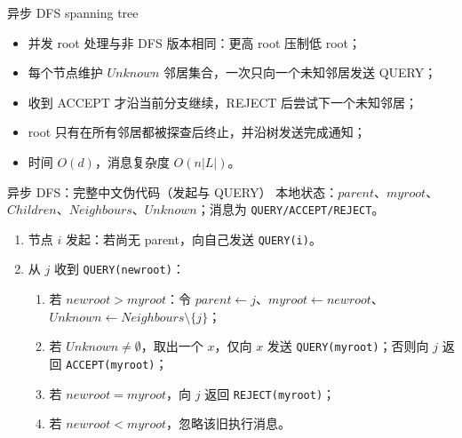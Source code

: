 \documentclass[UTF8,fontset=none,aspectratio=169,10pt]{beamer}
\begin{document}
\begin{frame}{异步 DFS spanning tree}
\begin{itemize}
  \item 并发 root 处理与非 DFS 版本相同：更高 root 压制低 root；
  \item 每个节点维护 $Unknown$ 邻居集合，一次只向一个未知邻居发送 QUERY；
  \item 收到 ACCEPT 才沿当前分支继续，REJECT 后尝试下一个未知邻居；
  \item root 只有在所有邻居都被探查后终止，并沿树发送完成通知；
  \item 时间 $O(d)$，消息复杂度 $O(n|L|)$。
\end{itemize}
\end{frame}

\begin{frame}{异步 DFS：完整中文伪代码（发起与 QUERY）}
\scriptsize
本地状态：$parent$、$myroot$、$Children$、$Neighbours$、$Unknown$；消息为 \texttt{QUERY/ACCEPT/REJECT}。
\begin{enumerate}
  \item 节点 $i$ 发起：若尚无 parent，向自己发送 \texttt{QUERY(i)}。
  \item 从 $j$ 收到 \texttt{QUERY(newroot)}：
    \begin{enumerate}
      \item 若 $newroot>myroot$：令 $parent\leftarrow j$、$myroot\leftarrow newroot$、$Unknown\leftarrow Neighbours\setminus\{j\}$；
      \item 若 $Unknown\neq\emptyset$，取出一个 $x$，仅向 $x$ 发送 \texttt{QUERY(myroot)}；否则向 $j$ 返回 \texttt{ACCEPT(myroot)}；
      \item 若 $newroot=myroot$，向 $j$ 返回 \texttt{REJECT(myroot)}；
      \item 若 $newroot<myroot$，忽略该旧执行消息。
    \end{enumerate}
\end{enumerate}
\end{frame}
\end{document}
